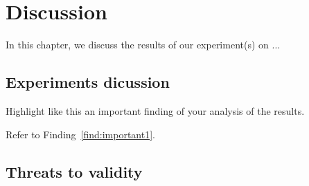 \chapter{Discussion}\label{ch:Discussion}
In this chapter, we discuss the results of our experiment(s) on ...

\section{Experiments dicussion}

\begin{finding}
	Highlight like this an important finding of your analysis of the results.
	\label{find:important1}
\end{finding}

Refer to Finding~\ref{find:important1}.

\section{Threats to validity}
